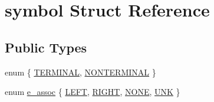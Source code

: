 \hypertarget{structsymbol}{\section{symbol Struct Reference}
\label{structsymbol}
}
\subsection*{Public Types}
\begin{DoxyCompactItemize}
\item 
enum \{ \hyperlink{structsymbol_a242da504a37dd209a6efc3081af86398a4dda29b0fd0fb56d3150477e0ad05719}{T\-E\-R\-M\-I\-N\-A\-L}, 
\hyperlink{structsymbol_a242da504a37dd209a6efc3081af86398af6dfc61644c21d651c80f4739b176d59}{N\-O\-N\-T\-E\-R\-M\-I\-N\-A\-L}
 \}
\item 
enum \hyperlink{structsymbol_a898f1247f875b32c8d38fcb533096ff7}{e\-\_\-assoc} \{ \hyperlink{structsymbol_a898f1247f875b32c8d38fcb533096ff7a0144ac577a110a479a0932942b9b75a6}{L\-E\-F\-T}, 
\hyperlink{structsymbol_a898f1247f875b32c8d38fcb533096ff7abc003df93b64dcd23cf6be03a9f0578c}{R\-I\-G\-H\-T}, 
\hyperlink{structsymbol_a898f1247f875b32c8d38fcb533096ff7ac2a025171e72c2bfa515e05a10aaa2c6}{N\-O\-N\-E}, 
\hyperlink{structsymbol_a898f1247f875b32c8d38fcb533096ff7ac96d39d8ea5dfa8635dd319df45e2424}{U\-N\-K}
 \}
\end{DoxyCompactItemize}
